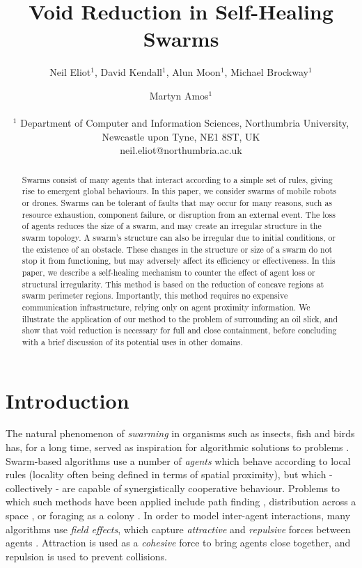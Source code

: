 \documentclass[letterpaper]{article}
\title{Void Reduction in Self-Healing Swarms}
\author{Neil Eliot$^{1}$, David Kendall$^{1}$, Alun Moon$^{1}$,  Michael Brockway$^{1}$ \and Martyn Amos$^{1}$ \\
\mbox{} \\
$^1$ Department of Computer and Information Sciences, Northumbria University, Newcastle upon Tyne, NE1 8ST, UK \\
neil.eliot@northumbria.ac.uk} %
\begin{document}
\maketitle

\begin{abstract}

Swarms consist of many agents that interact according to a simple set of rules, giving rise to emergent global behaviours. In this paper, we consider swarms of mobile robots or drones. Swarms can be tolerant of faults that may occur for many reasons, such as resource exhaustion, component failure, or disruption from an external event. The loss of agents reduces the size of a swarm, and may create an irregular structure in the swarm topology. A swarm's structure can also be irregular due to initial conditions, or the existence of an obstacle. These changes in the structure or size of a swarm do not stop it from functioning, but may adversely affect its efficiency or effectiveness. In this paper, we describe a self-healing mechanism to counter the effect of agent loss or structural irregularity. This method is based on the reduction of concave regions at swarm perimeter regions. Importantly, this method requires no expensive communication infrastructure, relying only on agent proximity information. We illustrate the application of our method to the problem of surrounding an oil slick, and show that void reduction is necessary for full and close containment, before concluding with a brief discussion of its potential uses in other domains.
\end{abstract}

\section{Introduction}
\label{sec:ConcaveReduction}

The natural phenomenon of {\it swarming} in organisms such as insects, fish and birds has, for a long time, served as inspiration for algorithmic solutions to problems \citep{blummerkle}.
Swarm-based algorithms use a number of {\it agents} which behave according to local rules (locality often being defined in terms of spatial proximity), but which - collectively - are capable of synergistically cooperative behaviour. Problems to which such methods have been applied include path finding \citep{HCS:09}, distribution across a space \citep{EP:10, GP:02, GP:04}, or foraging as a colony \citep{GK:07, HER:11}. In order to model inter-agent interactions, many algorithms use {\em field effects}, which capture {\it attractive} and {\it repulsive} forces between agents \citep{APZDAMC:09, BAFVM:06, BAF:06,  BM:09, GP:02, GP:04a, GP:05, GP:11, MYP:09}.  Attraction is used as a {\it cohesive} force to bring agents close together, and repulsion is used to prevent collisions. 
\end{document}
